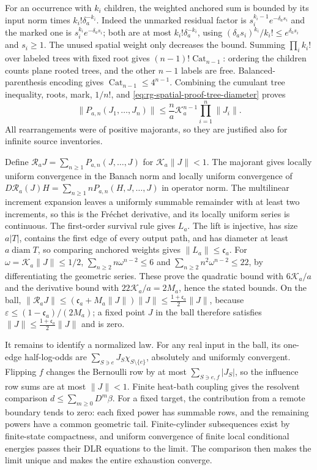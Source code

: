 For an occurrence with \(k_i\) children, the weighted anchored sum is
bounded by its input norm times \(k_i!\delta_a^{-k_i}\). Indeed the
unmarked residual factor is \(s_i^{k_i-1}e^{-\delta_as_i}\) and the marked
one is \(s_i^{k_i}e^{-\delta_as_i}\); both are at most
\(k_i!\delta_a^{-k_i}\), using \((\delta_as_i)^{k_i}/k_i!\le
e^{\delta_as_i}\) and \(s_i\ge1\). The unused spatial weight only decreases
the bound. Summing \(\prod_ik_i!\) over labeled trees with fixed root gives
\((n-1)!\operatorname{Cat}_{n-1}\): ordering the children counts plane
rooted trees, and the other \(n-1\) labels are free. Balanced-parenthesis
encoding gives \(\operatorname{Cat}_{n-1}\le4^{n-1}\). Combining the
cumulant tree inequality, roots, mark, \(1/n!\), and
\cref{eq:rg-spatial-proof-tree-diameter} proves
\begin{equation}
 \|P_{a,n}(J_1,\ldots,J_n)\|
 \le\frac na\mathcal K_a^{n-1}\prod_{i=1}^n\|J_i\|.
 \label{eq:rg-spatial-proof-multilinear-majorant}
\end{equation}
All rearrangements were of positive majorants, so they are justified also
for infinite source inventories.

Define \(\mathscr R_aJ=\sum_{n\ge1}P_{a,n}(J,\ldots,J)\) for
\(\mathcal K_a\|J\|<1\). The majorant gives locally uniform convergence in
the Banach norm and locally uniform convergence of
\(D\mathscr R_a(J)H=\sum_{n\ge1}nP_{a,n}(H,J,\ldots,J)\) in operator norm.
The multilinear increment expansion leaves a uniformly summable remainder
with at least two increments, so this is the Fr\'echet derivative, and its
locally uniform series is continuous. The first-order survival rule gives
\(L_a\). The lift is injective, has size \(a|T|\), contains the first edge
of every output path, and has diameter at least \(a\operatorname{diam}T\),
so comparing anchored weights gives \(\|L_a\|\le\mathfrak c_a\). For
\(\omega=\mathcal K_a\|J\|\le1/2\), \(\sum_{n\ge2}n\omega^{n-2}\le6\) and
\(\sum_{n\ge2}n^2\omega^{n-2}\le22\), by differentiating the geometric
series. These prove the quadratic bound with \(6\mathcal K_a/a\) and the
derivative bound with \(22\mathcal K_a/a=2M_a\), hence the stated bounds.
On the ball,
\(\|\mathscr R_aJ\|\le(\mathfrak c_a+M_a\|J\|)\|J\|\le\frac{1+\mathfrak c_a}2\|J\|\),
because \(\varepsilon\le(1-\mathfrak c_a)/(2M_a)\); a fixed point \(J\) in the ball therefore satisfies
\(\|J\|\le\frac{1+\mathfrak c_a}2\|J\|\) and is zero.

It remains to identify a normalized law. For any real input in the ball,
its one-edge half-log-odds are \(\sum_{S\ni e}J_S\chi_{S\setminus\{e\}}\),
absolutely and uniformly convergent. Flipping \(f\) changes the Bernoulli
row by at most \(\sum_{S\ni e,f}|J_S|\), so the influence row sums are at
most \(\|J\|<1\). Finite heat-bath coupling gives the resolvent comparison
\(d\le\sum_{m\ge0}D^m\beta\). For a fixed target, the contribution from a
remote boundary tends to zero: each fixed power has summable rows, and the
remaining powers have a common geometric tail. Finite-cylinder
subsequences exist by finite-state compactness, and uniform convergence of
finite local conditional energies passes their DLR equations to the limit.
The comparison then makes the limit unique and makes the entire exhaustion
converge.

